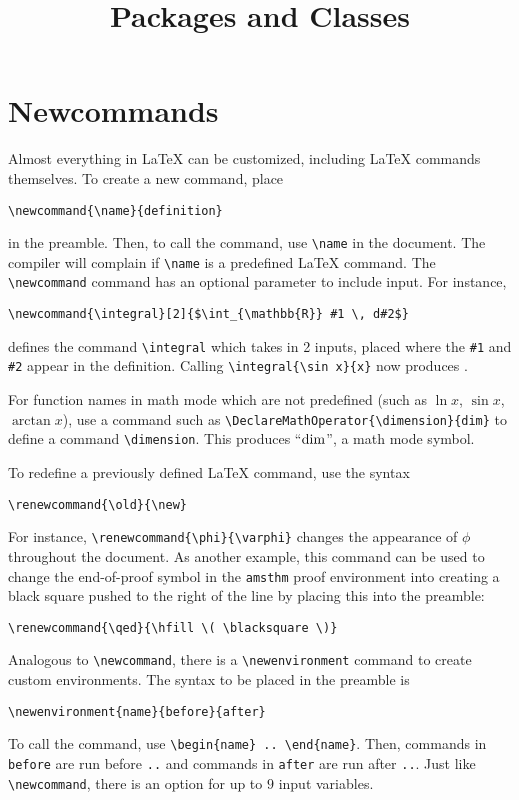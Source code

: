\documentclass[11pt]{paper}
\title{Packages and Classes}
\date{}
\begin{document}
\maketitle

\section{Newcommands}

Almost everything in \LaTeX{} can be customized, including
\LaTeX{} commands themselves.  To create a new command, place
\begin{lstlisting}
\newcommand{\name}{definition}
\end{lstlisting}
in the preamble.  Then, to call the command, use \verb~\name~ in
the document.  The compiler will complain if \verb~\name~ is a
predefined \LaTeX{} command.  The \verb~\newcommand~ command has
an optional parameter to include input.  For instance,
\begin{lstlisting}
\newcommand{\integral}[2]{$\int_{\mathbb{R}} #1 \, d#2$}
\end{lstlisting}
defines the command \verb~\integral~ which takes in 2 inputs,
placed where the \verb~#1~ and \verb~#2~ appear in the definition.
Calling \verb~\integral{\sin x}{x}~ now produces .

For function names in math mode which are not predefined (such as
$\ln x$, $\sin x$, $\arctan x$), use a command such as
\verb~\DeclareMathOperator{\dimension}{dim}~ to define a command
\verb~\dimension~.  This produces ``$\dimension$'', a math mode
symbol.

To redefine a previously defined \LaTeX{} command, use the syntax
\begin{verbatim}
\renewcommand{\old}{\new}
\end{verbatim}
For instance, \verb~\renewcommand{\phi}{\varphi}~ changes the
appearance of $\phi$ throughout the document.  As another example,
this command can be used to change the end-of-proof symbol in the
\verb~amsthm~ proof environment into creating a black square
pushed to the right of the line by placing this into the preamble:
\begin{lstlisting}
\renewcommand{\qed}{\hfill \( \blacksquare \)}
\end{lstlisting}

Analogous to \verb~\newcommand~, there is a \verb~\newenvironment~
command to create custom environments.  The syntax to be placed in
the preamble is
\begin{lstlisting}
\newenvironment{name}{before}{after}
\end{lstlisting}
To call the command, use \verb~\begin{name} .. \end{name}~.  Then,
commands in \verb~before~ are run before \verb~..~ and commands in
\verb~after~ are run after \verb~..~.  Just like
\verb~\newcommand~, there is an option for up to $9$ input
variables.
\end{document}
